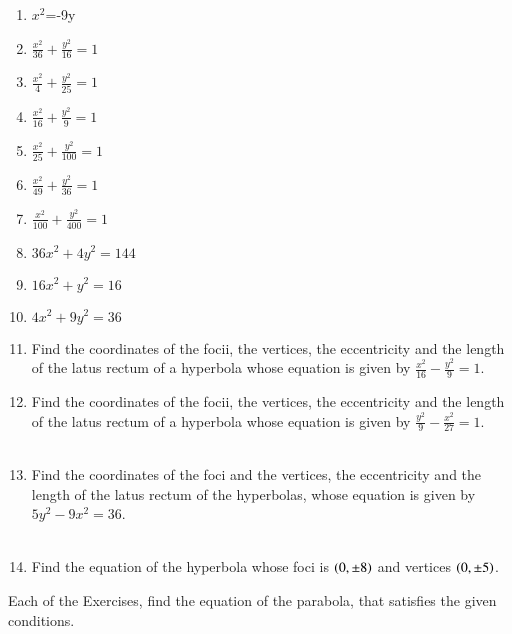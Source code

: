 \begin{enumerate}[label=\thesubsection.\arabic*,ref=\thesubsection.\theenumi]
\item $x^2$=-9y  
  \item $\frac{x^2}{36}+\frac{y^2}{16}=1$
\\
\solution
%
  \item $\frac{x^2}{4}+\frac{y^2}{25}=1$
\\
\solution
%
  \item $\frac{x^2}{16}+\frac{y^2}{9}=1$
\\
\solution
%
  \item $\frac{x^2}{25}+\frac{y^2}{100}=1$
  \item $\frac{x^2}{49}+\frac{y^2}{36}=1$
  \item $\frac{x^2}{100}+\frac{y^2}{400}=1$
  \item $36x^2+4y^2=144$
  \item $16x^2+y^2=16$
  \item $4x^2+9y^2=36$
	\item Find the coordinates of the focii, the vertices, the eccentricity and the length of the latus rectum of a hyperbola whose equation is given by $\frac{x^2}{16}-\frac{y^2}{9} = 1$. \\ 
		\solution
	\item Find the coordinates of the focii, the vertices, the eccentricity and the length of the latus rectum of a hyperbola whose equation is given by $\frac{y^2}{9}-\frac{x^2}{27}=1$.
		\\
		\solution
		\\
	\item Find the coordinates of the foci and the vertices, the eccentricity and the length of the latus rectum of the hyperbolas, whose equation is given by $5{y^2}-9{x^2}=36$.
		\\
		\solution
		\\
	\item Find the equation of the hyperbola whose foci is $\left(0,\pm 8\right)$ and vertices $\left(0,\pm 5\right)$.
\\
\solution
\end{enumerate}

Each of the Exercises, find the equation of the parabola, that satisfies the given conditions.

